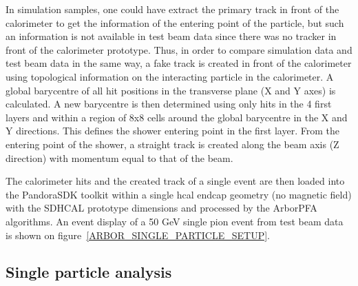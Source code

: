 \documentclass[cits]{JINST}
\begin{document}
In simulation samples, one could have extract the primary track in front of the calorimeter to get the information of the entering point of the particle, but such an information is not available in test beam data since there was no tracker in front of the calorimeter prototype. Thus, in order to compare simulation data and test beam data in the same way, a fake track is created in front of the calorimeter using topological information on the interacting particle in the calorimeter. A global barycentre of all hit positions in the transverse plane (X and Y axes) is calculated. A new barycentre is then determined using only hits in the 4 first layers and within a region of 8x8 cells around the global barycentre in the X and Y directions. This defines the shower entering point in the first layer. From the entering point of the shower, a straight track is created along the beam axis (Z direction) with momentum equal to that of the beam.

The calorimeter hits and the created track of a single event are then loaded into the PandoraSDK toolkit \cite{pandora-sdk} within a single hcal endcap geometry (no magnetic field) with the SDHCAL prototype dimensions and processed by the ArborPFA algorithms. An event display of a 50 GeV single pion event from test beam data is shown on figure~\ref{ARBOR_SINGLE_PARTICLE_SETUP}.

\subsection{Single particle analysis}
\end{document}
